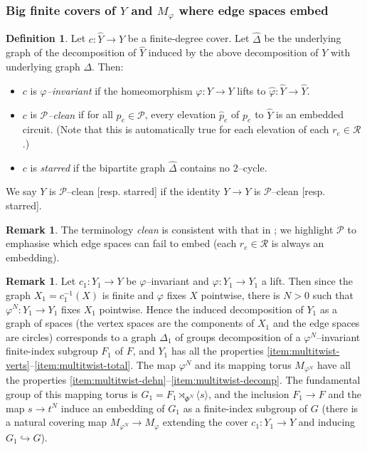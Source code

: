 \documentclass[11pt,oneside]{amsart}
\theoremstyle{definition}
\newtheorem{defn}[thm]{Definition}
\newtheorem{rem}[thm]{Remark}
\begin{document}
\subsubsection{Big finite covers of $Y$ and $M_\varphi$ where edge spaces embed}\label{subsubsec:linear-finite-covers}  


\begin{defn}\label{defn:P-embedded-starred}
Let $c:\widehat Y\to Y$ be a finite-degree cover.  Let $\widehat{\Delta}$ be the underlying graph of the decomposition of $\widehat Y$ induced by the above decomposition of $Y$ with underlying graph $\Delta$.  Then:
\begin{itemize}
    \item $c$ is \emph{$\varphi$--invariant} if the homeomorphism $\varphi:Y\to Y$ lifts to $\hat \varphi:\widehat Y\to\widehat Y$.

    \item $c$ is \emph{$\mathcal P$--clean } if for all $p_e\in\mathcal P$, every elevation $\hat p_e$ of $p_e$ to $\widehat Y$ is an embedded circuit.  (Note that this is automatically true for each elevation of each $r_e\in\mathcal R$.)

    \item $c$ is \emph{starred} if the bipartite graph $\widehat{\Delta}$ contains no $2$--cycle.
\end{itemize}
We say $Y$ is $\mathcal P$--clean  [resp. starred] if the identity  $Y\to Y$ is $\mathcal P$--clean  [resp. starred].
\end{defn}

\begin{rem}
The terminology \emph{clean} is consistent with that in \cite[Def. 4.5]{Wise:omnipotence}; we highlight $\mathcal P$ to emphasise which edge spaces  can fail to embed (each $r_e\in\mathcal R$ is always an embedding).
\end{rem}

\begin{rem}\label{rem:invariant-cover}
Let $c_1:Y_1\to Y$ be $\varphi$--invariant and $\varphi:Y_1\to Y_1$ a lift.  Then since the graph $X_1=c_1^{-1}(X)$ is finite and $\varphi$ fixes $X$ pointwise, there is $N>0$ such that $\varphi^N:Y_1\to Y_1$ fixes $X_1$ pointwise.  Hence the induced decomposition of $Y_1$ as a graph of spaces (the vertex spaces are the components of $X_1$ and the edge spaces are circles) corresponds to a graph $\Delta_1$ of groups decomposition of a $\varphi^N$--invariant finite-index subgroup $F_1$ of $F$, and $Y_1$ has all the properties \eqref{item:multitwist-verts}--\eqref{item:multitwist-total}.  The map $\varphi^N$ and its mapping torus $M_{\varphi^N}$ have all the properties \eqref{item:multitwist-dehn}--\eqref{item:multitwist-decomp}.  The fundamental group of this mapping torus is $G_1=F_1\rtimes_{\Phi^N}\langle s\rangle$, and the inclusion $F_1\to F$ and the map $s\to t^N$ induce an embedding of $G_1$ as a finite-index subgroup of $G$ (there is a natural covering map $M_{\varphi^N}\to M_\varphi$ extending the cover $c_1:Y_1\to Y$ and inducing $G_1\hookrightarrow G$).  
\end{rem}
\end{document}
